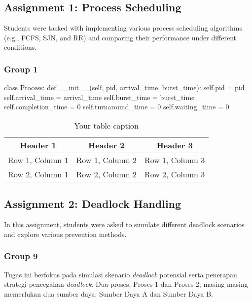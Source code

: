 \documentclass[12pt]{article}
\begin{document}
\subsection{Assignment 1: Process Scheduling}
Students were tasked with implementing various process scheduling algorithms (e.g., FCFS, SJN, and RR) and comparing their performance under different conditions.
\subsubsection{Group 1}
\begin{python}
    class Process:
    def __init__(self, pid, arrival_time, burst_time):
        self.pid = pid
        self.arrival_time = arrival_time
        self.burst_time = burst_time
        self.completion_time = 0
        self.turnaround_time = 0
        self.waiting_time = 0
\end{python}

\begin{table}[htbp] %
    \centering
    \begin{tabular}{|c|c|c|} %
    \hline
    Header 1 & Header 2 & Header 3 \\ %
    \hline
    Row 1, Column 1 & Row 1, Column 2 & Row 1, Column 3 \\ %
    \hline
    Row 2, Column 1 & Row 2, Column 2 & Row 2, Column 3 \\ %
    \hline
    \end{tabular}
    \caption{Your table caption} %
    \label{tab:your_label} %
\end{table}
\subsection{Assignment 2: Deadlock Handling}
	In this assignment, students were asked to simulate different deadlock scenarios and explore various prevention methods.

\subsubsection{Group 9}

Tugas ini berfokus pada simulasi skenario \textit{deadlock} potensial serta penerapan strategi pencegahan \textit{deadlock}. Dua proses, Proses 1 dan Proses 2, masing-masing memerlukan dua sumber daya: Sumber Daya A dan Sumber Daya B.
\end{document}
